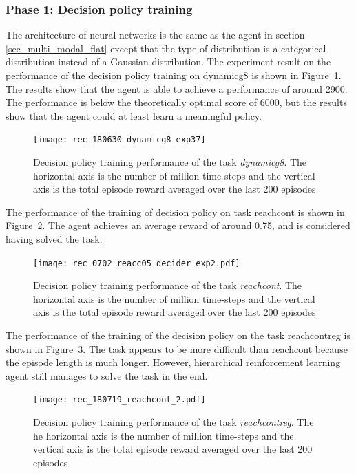 \subsubsection{Phase 1: Decision policy training}
The architecture of neural networks is the same as the agent in section \ref{sec_multi_modal_flat} except that the type of distribution is a categorical distribution instead of a Gaussian distribution.
The experiment result on the performance of the decision policy training on dynamicg8 is shown in Figure~\ref{fig:rec_dynamicg8_decider_subt10}. The results show that the agent is able to achieve a performance of around 2900. The performance is below the theoretically optimal score of 6000, but the results show that the agent could at least learn a meaningful policy.

\begin{figure}[!htbp]
\centering
\texttt{[image: rec\_180630\_dynamicg8\_exp37]}
\caption{Decision policy training performance of the task \textit{dynamicg8}. The horizontal axis is the number of million time-steps and the vertical axis is the total episode reward averaged over the last 200 episodes}
\label{fig:rec_dynamicg8_decider_subt10}
\end{figure}

The performance of the training of decision policy on task reachcont is shown in Figure~\ref{fig:rec_reachc05_decider_subt10}. The agent achieves an average reward of around 0.75, and is considered having solved the task.
\begin{figure}[!htbp]
\centering
\texttt{[image: rec\_0702\_reacc05\_decider\_exp2.pdf]}
\caption{Decision policy training performance of the task \textit{reachcont}. The horizontal axis is the number of million time-steps and the vertical axis is the total episode reward averaged over the last 200 episodes}
\label{fig:rec_reachc05_decider_subt10}
\end{figure}

The performance of the training of the decision policy on the task reachcontreg is shown in Figure~\ref{rec_reachcontreg}. The task appears to be more difficult than reachcont because the episode length is much longer. However, hierarchical reinforcement learning agent still manages to solve the task in the end.
\begin{figure}[!htbp]
	\centering
	\texttt{[image: rec\_180719\_reachcont\_2.pdf]}
	\caption{Decision policy training performance of the task \textit{reachcontreg}. The he horizontal axis is the number of million time-steps and the vertical axis is the total episode reward averaged over the last 200 episodes}
	\label{rec_reachcontreg}
\end{figure}

